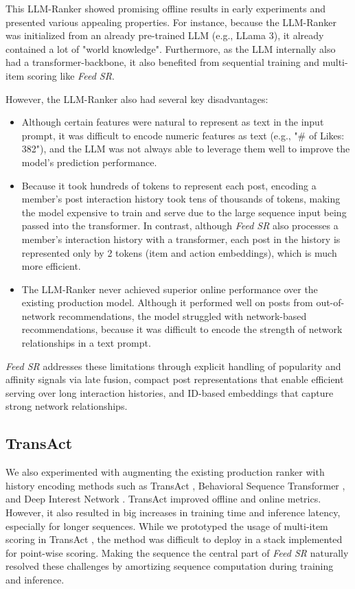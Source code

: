 \documentclass[sigconf]{acmart}
\newcommand{\systemname}{\textit{Feed SR}}
\begin{document}
This LLM-Ranker showed promising offline results in early experiments and presented various appealing properties. For instance, because the LLM-Ranker was initialized from an already pre-trained LLM (e.g., LLama 3), it already contained a lot of "world knowledge". Furthermore, as the LLM internally also had a transformer-backbone, it also benefited from sequential training and multi-item scoring like {\systemname}.

However, the LLM-Ranker also had several key disadvantages:
\begin{itemize}
    \item Although certain features were natural to represent as text in the input prompt, it was difficult to encode numeric features as text (e.g., "\# of Likes: 382"), and the LLM was not always able to leverage them well to improve the model's prediction performance.
    \item Because it took hundreds of tokens to represent each post, encoding a member's post interaction history took tens of thousands of tokens, making the model expensive to train and serve due to the large sequence input being passed into the transformer. In contrast, although {\systemname} also processes a member's interaction history with a transformer, each post in the history is represented only by 2 tokens (item and action embeddings), which is much more efficient.
    \item The LLM-Ranker never achieved superior online performance over the existing production model. Although it performed well on posts from out-of-network recommendations, the model struggled with network-based recommendations, because it was difficult to encode the strength of network relationships in a text prompt.
\end{itemize}
{\systemname} addresses these limitations through explicit handling of popularity and affinity signals via late fusion, compact post representations that enable efficient serving over long interaction histories, and ID-based embeddings that capture strong network relationships.

\subsection{TransAct}
We also experimented with augmenting the existing production ranker with history encoding methods such as TransAct \cite{xia2023transact}, Behavioral Sequence Transformer \cite{chen2019behavior}, and Deep Interest Network \cite{zhou2018deep}. TransAct improved offline and online metrics. However, it also resulted in big increases in training time and inference latency, especially for longer sequences. While we prototyped the usage of multi-item scoring in TransAct \cite{hertel2024efficient}, the method was difficult to deploy in a stack implemented for point-wise scoring. Making the sequence the central part of {\systemname} naturally resolved these challenges by amortizing sequence computation during training and inference.
\end{document}
